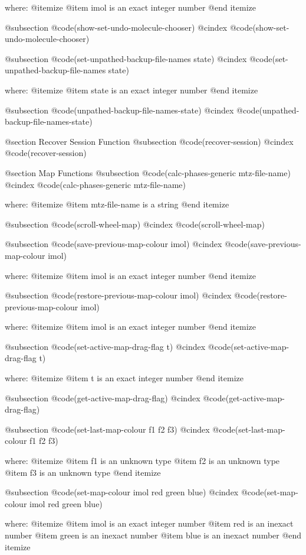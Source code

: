 where: 
 @itemize 
     @item imol is an exact integer number
 @end itemize


@subsection @code{(show-set-undo-molecule-chooser)}
@cindex @code{(show-set-undo-molecule-chooser)}
 
@subsection @code{(set-unpathed-backup-file-names state)}
@cindex @code{(set-unpathed-backup-file-names state)}
 
where: 
 @itemize 
     @item state is an exact integer number
 @end itemize


@subsection @code{(unpathed-backup-file-names-state)}
@cindex @code{(unpathed-backup-file-names-state)}
 

@section Recover Session Function 
@subsection @code{(recover-session)}
@cindex @code{(recover-session)}
 

@section Map Functions 
@subsection @code{(calc-phases-generic mtz-file-name)}
@cindex @code{(calc-phases-generic mtz-file-name)}
 
where: 
 @itemize 
     @item mtz-file-name is a string
 @end itemize


@subsection @code{(scroll-wheel-map)}
@cindex @code{(scroll-wheel-map)}
 
@subsection @code{(save-previous-map-colour imol)}
@cindex @code{(save-previous-map-colour imol)}
 
where: 
 @itemize 
     @item imol is an exact integer number
 @end itemize


@subsection @code{(restore-previous-map-colour imol)}
@cindex @code{(restore-previous-map-colour imol)}
 
where: 
 @itemize 
     @item imol is an exact integer number
 @end itemize


@subsection @code{(set-active-map-drag-flag t)}
@cindex @code{(set-active-map-drag-flag t)}
 
where: 
 @itemize 
     @item t is an exact integer number
 @end itemize


@subsection @code{(get-active-map-drag-flag)}
@cindex @code{(get-active-map-drag-flag)}
 
@subsection @code{(set-last-map-colour f1 f2 f3)}
@cindex @code{(set-last-map-colour f1 f2 f3)}
 
where: 
 @itemize 
     @item f1 is an unknown type
     @item f2 is an unknown type
     @item f3 is an unknown type
 @end itemize


@subsection @code{(set-map-colour imol red green blue)}
@cindex @code{(set-map-colour imol red green blue)}
 
where: 
 @itemize 
     @item imol is an exact integer number
     @item red is an inexact number
     @item green is an inexact number
     @item blue is an inexact number
 @end itemize


